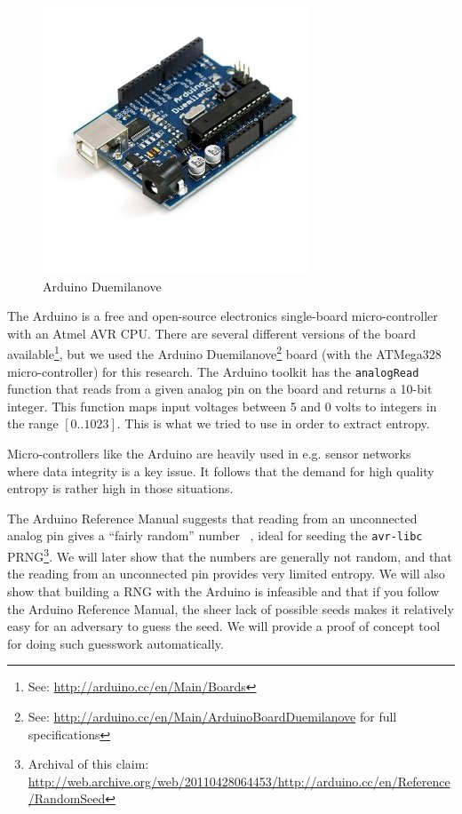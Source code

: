 \documentclass[a4paper]{article}           %
\begin{document}
\begin{figure}[H]
  \centering  
  \includegraphics[width=0.7\columnwidth]{img/ard.jpg}
  
  \caption{Arduino Duemilanove}
  \label{fig:ard3space}
\end{figure}


The Arduino is a free and open-source electronics single-board micro-controller with an Atmel AVR CPU. There are several different versions of the board available\footnote{See: \url{http://arduino.cc/en/Main/Boards}}, but we used the Arduino Duemilanove\footnote{See: \url{http://arduino.cc/en/Main/ArduinoBoardDuemilanove} for full specifications} board (with the ATMega328 ~\cite{atmegads} micro-controller) for this research. The Arduino toolkit has the \texttt{analogRead} function that reads from a given analog pin on the board and returns a 10-bit integer. This function maps input voltages between 5 and 0 volts to integers in the range $[0..1023]$. This is what we tried to use in order to extract entropy.

Micro-controllers like the Arduino are heavily used in e.g. sensor networks ~\cite{tsense} where data integrity is a key issue. It follows that the demand for high quality entropy is rather high in those situations. 

The Arduino Reference Manual suggests that reading from an unconnected analog pin gives a ``fairly random'' number ~\cite{ardref}, ideal for seeding the \texttt{avr-libc} PRNG\footnote{Archival of this claim: \url{http://web.archive.org/web/20110428064453/http://arduino.cc/en/Reference/RandomSeed}}. We will later show that the numbers are generally not random, and that the reading from an unconnected pin provides very limited entropy. We will also show that building a RNG with the Arduino is infeasible and that if you follow the Arduino Reference Manual, the sheer lack of possible seeds makes it relatively easy for an adversary to guess the seed. We will provide a proof of concept tool for doing such guesswork automatically. 
\end{document}
